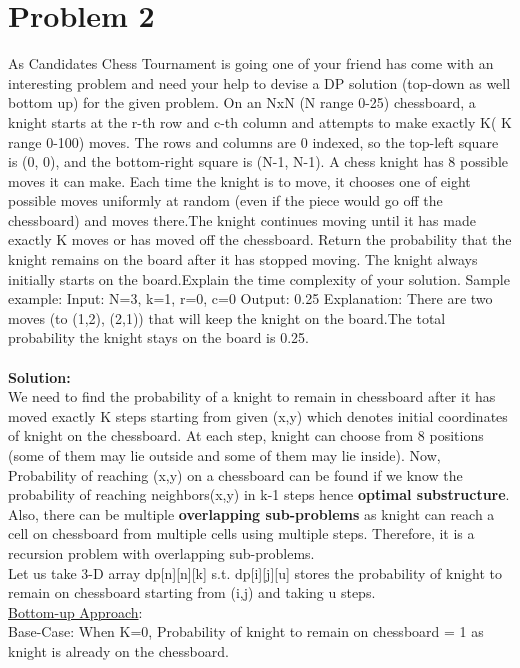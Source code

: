 \documentclass{article}
\begin{document}
\section*{Problem 2}
As Candidates Chess Tournament is going one of your friend has come with an interesting problem and need your help to devise a DP solution (top-down as well bottom up) for the given problem. On an NxN (N range 0-25) chessboard, a knight starts at the r-th row and c-th column and attempts to make exactly K( K range 0-100) moves. The rows and columns are 0 indexed, so the top-left square is (0, 0), and the bottom-right square is (N-1, N-1). A chess knight has 8 possible moves it can make. Each time the knight is to move, it chooses one of eight possible moves uniformly at random (even if the piece would go off the chessboard) and moves there.The knight continues moving until it has made exactly K moves or has moved off the chessboard. Return the probability that the knight remains on the board after it has stopped moving. The knight always initially starts on the board.Explain the time complexity of your solution. Sample example: Input: N=3, k=1, r=0, c=0 Output: 0.25 Explanation: There are two moves (to (1,2), (2,1)) that will keep the knight on the board.The total probability the knight stays on the board is 0.25. \\
\vspace{1mm} \\
\textbf{Solution:} \\
We need to find the probability of a knight to remain in chessboard after it has moved exactly K steps starting from given (x,y) which denotes initial coordinates of knight on the chessboard. At each step, knight can choose from 8 positions (some of them may lie outside and some of them may lie inside). Now, Probability of reaching (x,y) on a chessboard can be found if we know the probability of reaching neighbors(x,y) in k-1 steps hence \textbf{optimal substructure}. Also, there can be multiple \textbf{overlapping sub-problems} as knight can reach a cell on chessboard from multiple cells using multiple steps. Therefore, it is a recursion problem with overlapping sub-problems. \\
Let us take 3-D array dp[n][n][k] s.t. dp[i][j][u] stores the probability of knight to remain on chessboard starting from (i,j) and taking u steps. \\
\underline{Bottom-up Approach}: \\
Base-Case: When K=0, Probability of knight to remain on chessboard = 1 as knight is already on the chessboard. \\
\end{document}
